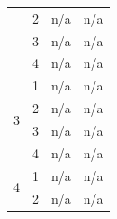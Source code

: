 \begin{table}[H]
\begin{tabular}{|c|c|c|c|}
    & 2                                                                            & n/a                                                                              & n/a                                                                              \\ \cline{2-4} 
    & 3                                                                            & n/a                                                                              & n/a                                                                              \\ \cline{2-4} 
    & 4                                                                            & n/a                                                                              & n/a                                                                              \\ \hline
  \multirow{4}{*}{3}                                                           & 1                                                                            & n/a                                                                              & n/a                                                                              \\ \cline{2-4} 
    & 2                                                                            & n/a                                                                              & n/a                                                                              \\ \cline{2-4} 
    & 3                                                                            & n/a                                                                              & n/a                                                                              \\ \cline{2-4} 
    & 4                                                                            & n/a                                                                              & n/a                                                                              \\ \hline
  \multirow{4}{*}{4}                                                           & 1                                                                            & n/a                                                                              & n/a                                                                              \\ \cline{2-4} 
    & 2                                                                            & n/a                                                                              & n/a                                                                              \\ \cline{2-4} 

\end{tabular}
\end{table}
